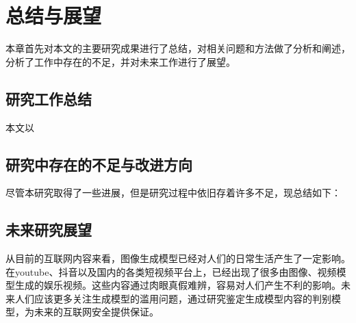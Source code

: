 \chapter{总结与展望}
\label{chapter5}
本章首先对本文的主要研究成果进行了总结，对相关问题和方法做了分析和阐述，分析了工作中存在的不足，并对未来工作进行了展望。
\section{研究工作总结}
本文以

\section{研究中存在的不足与改进方向}
尽管本研究取得了一些进展，但是研究过程中依旧存着许多不足，现总结如下：



\section{未来研究展望}

从目前的互联网内容来看，图像生成模型已经对人们的日常生活产生了一定影响。在youtube、抖音以及国内的各类短视频平台上，已经出现了很多由图像、视频模型生成的娱乐视频。这些内容通过肉眼真假难辨，容易对人们产生不利的影响。未来人们应该更多关注生成模型的滥用问题，通过研究鉴定生成模型内容的判别模型，为未来的互联网安全提供保证。

